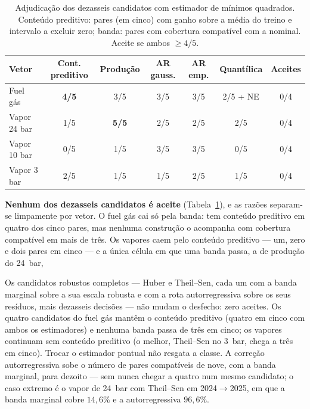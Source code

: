 \begin{table}[htbp]
  \centering
  \caption[Critério de aceitação: candidatos de mínimos quadrados]{Adjudicação
  dos dezasseis candidatos com estimador de mínimos quadrados. Conteúdo
  preditivo: pares (em cinco) com ganho sobre a média do treino e intervalo a
  excluir zero; banda: pares com cobertura compatível com a nominal. Aceite
  se ambos $\geq 4/5$.}
  \label{tab:gate}
  \small
  \begin{tabular}{lcccccc}
    \toprule
    Vetor & Cont. preditivo & Produção & AR gauss. & AR emp. & Quantílica & Aceites \\
    \midrule
    Fuel gás     & \textbf{4/5} & 3/5 & 3/5 & 3/5 & 2/5 + NE & 0/4 \\
    Vapor 24 bar & 1/5 & \textbf{5/5} & 2/5 & 2/5 & 2/5 & 0/4 \\
    Vapor 10 bar & 0/5 & 1/5 & 3/5 & 3/5 & 0/5 & 0/4 \\
    Vapor 3 bar  & 2/5 & 1/5 & 1/5 & 2/5 & 1/5 & 0/4 \\
    \bottomrule
  \end{tabular}
\end{table}

\textbf{Nenhum dos dezasseis candidatos é aceite} (Tabela~\ref{tab:gate}), e
as razões separam-se limpamente por vetor. O fuel gás cai só pela banda:
tem conteúdo preditivo em quatro dos cinco pares, mas nenhuma construção o
acompanha com cobertura compatível em mais de três. Os vapores caem pelo
conteúdo preditivo --- um, zero e dois pares em cinco --- e a única célula
em que uma banda passa, a de produção do 24~bar, 

Os candidatos robustos completos --- Huber e Theil--Sen, cada um com a banda
marginal sobre a sua escala robusta e com a rota autorregressiva sobre os
seus resíduos, mais dezasseis decisões --- não mudam o desfecho: zero
aceites. Os quatro candidatos do fuel gás mantêm o conteúdo preditivo
(quatro em cinco com ambos os estimadores) e nenhuma banda passa de três em
cinco; os vapores continuam sem conteúdo preditivo (o melhor, Theil--Sen no
3~bar, chega a três em cinco). Trocar o estimador pontual não resgata a
classe. A correção autorregressiva sobe o número de pares compatíveis de
nove, com a banda marginal, para dezoito --- sem nunca chegar a quatro num
mesmo candidato; o caso extremo é o vapor de 24~bar com Theil--Sen em
2024${\to}$2025, em que a banda marginal cobre $14{,}6\%$ e a autorregressiva
$96{,}6\%$.

